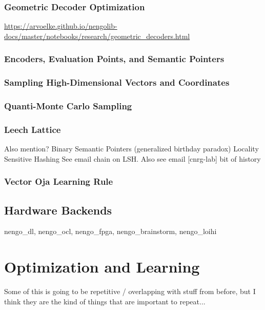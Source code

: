 \subsubsection{Geometric Decoder Optimization}

\url{https://arvoelke.github.io/nengolib-docs/master/notebooks/research/geometric\_decoders.html}

\subsubsection{Encoders, Evaluation Points, and Semantic Pointers}

\subsubsection{Sampling High-Dimensional Vectors and Coordinates}

\subsubsection{Quanti-Monte Carlo Sampling}

\subsubsection{Leech Lattice}

Also mention?
Binary Semantic Pointers (generalized birthday paradox)
Locality Sensitive Hashing
See email chain on LSH. Also see email [cnrg-lab] bit of history

\subsubsection{Vector Oja Learning Rule}


\subsection{Hardware Backends}

nengo\_dl, nengo\_ocl, nengo\_fpga, nengo\_brainstorm, nengo\_loihi


\section{Optimization and Learning}

Some of this is going to be repetitive / overlapping with stuff from before, but I think they are the kind of things that are important to repeat...

